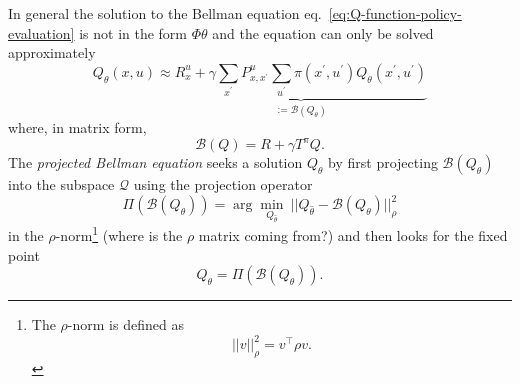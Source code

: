 In general the solution to the Bellman equation eq.~\eqref{eq:Q-function-policy-evaluation} is not in the form $\Phi\theta$ and the equation can only be solved approximately
\begin{equation*}
  Q_\theta(x,u) \approx \underbrace{R_x^u + \gamma\sum_{x^\prime} P_{x,x^\prime}^u \sum_{u^\prime} \pi(x^\prime,u^\prime)Q_\theta(x^\prime,u^\prime)}_{:=\mathcal{B}(Q_\theta)}
\end{equation*}
where, in matrix form,
\begin{equation}
  \label{eq:Q-function-matrix}
  \mathcal{B}(Q) = R + \gamma T^\pi Q.
\end{equation}
The \emph{projected Bellman equation} seeks a solution $Q_\theta$ by first projecting $\mathcal{B}(Q_\theta)$ into the subspace $\mathcal{Q}$ using the projection operator
\begin{equation*}
  \Pi(\mathcal{B}(Q_\theta)) = \arg \min_{Q_{\hat{\theta}}}\ |\!| Q_{\hat{\theta}} - \mathcal{B}(Q_\theta) |\!|_\rho^2
\end{equation*}
in the $\rho$-norm\footnote{The $\rho$-norm is defined as
\begin{equation*}
  |\!|v|\!|_\rho^2 = v^\top \rho v.
\end{equation*}}
(where is the $\rho$ matrix coming from?) and then looks for the fixed point
\begin{equation}
  \label{eq:projected-Bellman-equation}
  Q_\theta = \Pi(\mathcal{B}(Q_\theta)).
\end{equation}

